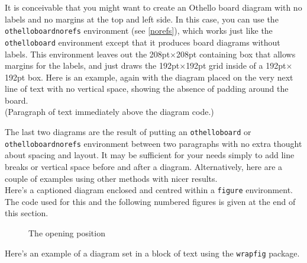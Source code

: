 \documentclass[a4paper,12pt]{article}
\begin{document}
\noindent It is conceivable that you might want to create an Othello board diagram with no labels and no margins at the top and left side. In this case, you can use the \verb=othelloboardnorefs= environment (see \ref{norefs}), which works just like the \verb=othelloboard= environment except that it produces board diagrams without labels. This environment leaves out the 208pt$\times$208pt containing box that allows margins for the labels, and just draws the 192pt$\times$192pt grid inside of a 192pt$\times$192pt box. Here is an example, again with the diagram placed on the very next line of text with no vertical space, showing the absence of padding around the board.\\
\clearpage
\noindent (Paragraph of text immediately above the diagram code.)\\
\noindent
\begin{othelloboardnorefs}{1}
\dotmarkings
\end{othelloboardnorefs}

\noindent The last two diagrams are the result of putting an \verb=othelloboard= or \verb=othelloboardnorefs= environment between two paragraphs with no extra thought about spacing and layout. It may be sufficient for your needs simply to add line breaks or vertical space before and after a diagram. Alternatively, here are a couple of examples using other methods with nicer results.\\

\noindent Here's a captioned diagram enclosed and centred within a \verb=figure= environment. The code used for this and the following numbered figures is given at the end of this section.

\begin{figure}[h]
\begin{center}
\begin{othelloboard}{.8}
\dotmarkings
{}
\end{othelloboard}
\caption{The opening position}
\end{center}
\end{figure}

\noindent Here's an example of a diagram set in a block of text using the \verb=wrapfig= package. \\
\end{document}
